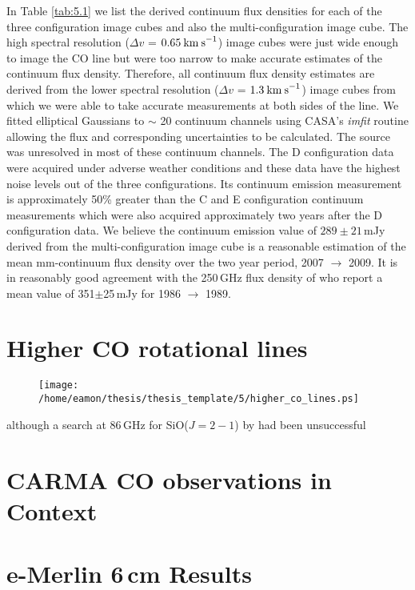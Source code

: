 In Table \ref{tab:5.1} we list the derived continuum flux densities for each of the three configuration image cubes and also the multi-configuration image cube. The high spectral resolution ($\Delta v$ = $0.65\>{\rm km\>s}^{-1}$) image cubes were just wide enough to image the CO line but were too narrow to make accurate estimates of the continuum flux density. Therefore, all continuum flux density estimates are derived from the lower spectral resolution ($\Delta v$ = $1.3\>{\rm km\>s}^{-1}$) image cubes from which we were able to take accurate measurements at both sides of the line. We fitted elliptical Gaussians to $\sim$ 20 continuum channels using CASA's \textit{imfit} routine allowing the flux and corresponding uncertainties to be calculated. The source was unresolved in most of these continuum channels. The D configuration data were acquired under adverse weather conditions and these data have the highest noise levels out of the three configurations. Its continuum emission measurement is approximately 50\% greater than the C and E configuration continuum measurements which were also acquired approximately two years after the D configuration data.  We believe the continuum emission value of $289 \pm 21$\,mJy derived from the multi-configuration image cube is a reasonable estimation of the mean mm-continuum flux density over the two year period, 2007 $\rightarrow$ 2009. It is in reasonably good agreement with the 250\,GHz flux density of \cite{altenhoff_1994} who report a mean value of 351$\pm$25\,mJy for 1986 $\rightarrow$ 1989.

\section{Higher CO rotational lines}\label{sec:5.10}

\begin{figure}[!ht]
\centering 
\texttt{[image: /home/eamon/thesis/thesis\_template/5/higher\_co\_lines.ps]}
\caption[]{}
\label{fig:5.12}
\end{figure}

 although a search at 86\,GHz for SiO($J= 2-1$) by \cite{lambert_1978} had been unsuccessful
 
\section{CARMA CO observations in Context}\label{sec:5.11}

\section{e-Merlin 6\,cm Results}\label{sec:5.12}

